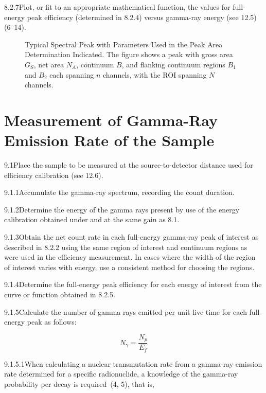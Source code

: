 \documentclass[12pt]{article}
\begin{document}
8.2.7\quad Plot, or fit to an appropriate mathematical function, the values for
full-energy peak efficiency (determined in 8.2.4) versus gamma-ray energy (see 12.5)
(6--14).

\begin{figure}[ht]
\centering
\fbox{\rule{0pt}{2.5in}\rule{4in}{0pt}}
\caption{Typical Spectral Peak with Parameters Used in the Peak Area Determination
Indicated. The figure shows a peak with gross area $G_S$, net area $N_A$, continuum
$B$, and flanking continuum regions $B_1$ and $B_2$ each spanning $n$ channels,
with the ROI spanning $N$ channels.}
\label{fig:spectral_peak}
\end{figure}

\section{Measurement of Gamma-Ray Emission Rate of the Sample}

9.1\quad Place the sample to be measured at the source-to-detector distance used for
efficiency calibration (see 12.6).

9.1.1\quad Accumulate the gamma-ray spectrum, recording the count duration.

9.1.2\quad Determine the energy of the gamma rays present by use of the energy
calibration obtained under and at the same gain as 8.1.

9.1.3\quad Obtain the net count rate in each full-energy gamma-ray peak of interest as
described in 8.2.2 using the same region of interest and continuum regions as were used
in the efficiency measurement. In cases where the width of the region of interest varies
with energy, use a consistent method for choosing the regions.

9.1.4\quad Determine the full-energy peak efficiency for each energy of interest from the
curve or function obtained in 8.2.5.

9.1.5\quad Calculate the number of gamma rays emitted per unit live time for each
full-energy peak as follows:

\begin{equation}
  N_\gamma = \frac{N_p}{E_f}
  \label{eq:emission_from_count}
\end{equation}

9.1.5.1\quad When calculating a nuclear transmutation rate from a gamma-ray emission
rate determined for a specific radionuclide, a knowledge of the gamma-ray probability per
decay is required~(4, 5), that is,
\end{document}
